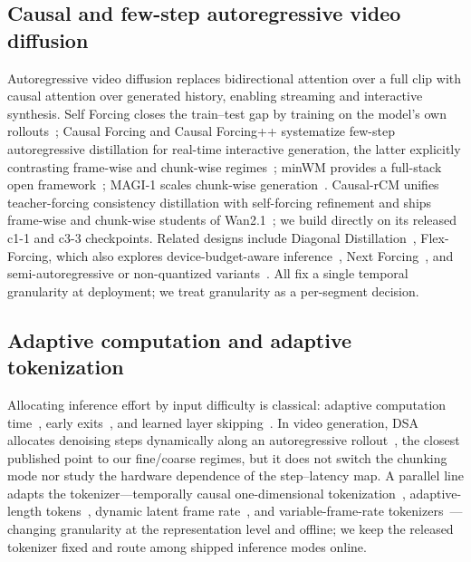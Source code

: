 \documentclass[journal]{IEEEtran}
\newcommand{\cfine}{\textup{c1-1}}
\newcommand{\ccoarse}{\textup{c3-3}}
\begin{document}
\subsection{Causal and few-step autoregressive video diffusion}
Autoregressive video diffusion replaces bidirectional attention over a full clip with causal attention over generated history, enabling streaming and interactive synthesis. Self Forcing closes the train--test gap by training on the model's own rollouts~\cite{huangSelfForcingBridging2025}; Causal Forcing and Causal Forcing++ systematize few-step autoregressive distillation for real-time interactive generation, the latter explicitly contrasting frame-wise and chunk-wise regimes~\cite{zhuCausalForcingAutoregressive2026a,zhaoCausalForcingScalable2026a}; minWM provides a full-stack open framework~\cite{zhaoMinWMFullStackOpenSource2026a}; MAGI-1 scales chunk-wise generation~\cite{aiMAGI1AutoregressiveVideo2025}. Causal-rCM unifies teacher-forcing consistency distillation with self-forcing refinement and ships frame-wise and chunk-wise students of Wan2.1~\cite{zhengCausalrCMUnifiedTeacherForcing2026,wan2025wan}; we build directly on its released \cfine{} and \ccoarse{} checkpoints. Related designs include Diagonal Distillation~\cite{liuStreamingAutoregressiveVideo2026}, Flex-Forcing, which also explores device-budget-aware inference~\cite{maFlexForcingUnifiedAutoregressive2026}, Next Forcing~\cite{xuNextForcingCausal2026}, and semi-autoregressive or non-quantized variants~\cite{renNextBlockPrediction2025,dengAutoregressiveVideoGeneration2025}. All fix a single temporal granularity at deployment; we treat granularity as a per-segment decision.

\subsection{Adaptive computation and adaptive tokenization}
Allocating inference effort by input difficulty is classical: adaptive computation time~\cite{gravesAdaptiveComputationTime2017}, early exits~\cite{teerapittayanonBranchyNetFastInference2017}, and learned layer skipping~\cite{wangSkipNetLearningDynamic2018}. In video generation, DSA allocates denoising steps dynamically along an autoregressive rollout~\cite{leDSADynamicStep2026}, the closest published point to our fine/coarse regimes, but it does not switch the chunking mode nor study the hardware dependence of the step--latency map. A parallel line adapts the tokenizer---temporally causal one-dimensional tokenization~\cite{liLearningAdaptiveTemporally2025}, adaptive-length tokens~\cite{xiongEVATokAdaptiveLength2026}, dynamic latent frame rate~\cite{yuanDLFRVAEDynamicLatent2025}, and variable-frame-rate tokenizers~\cite{zhongVFRTokVariableFrame2025}---changing granularity at the representation level and offline; we keep the released tokenizer fixed and route among shipped inference modes online.
\end{document}
